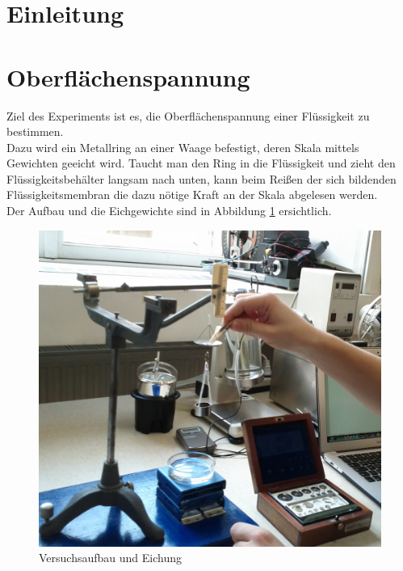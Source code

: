 \documentclass[12pt,a4paper]{article}
\begin{document}
\pagebreak
\setlength{\columnsep}{20pt}
\begin{multicols}{2}
\section{Einleitung}

\section{Oberflächenspannung}
Ziel des Experiments ist es, die Oberflächenspannung einer Flüssigkeit zu bestimmen. \\
Dazu wird ein Metallring an einer Waage befestigt, deren Skala mittels Gewichten geeicht wird. Taucht man den Ring in die Flüssigkeit und zieht den Flüssigkeitsbehälter langsam nach unten, kann beim Reißen der sich bildenden Flüssigkeitsmembran die dazu nötige Kraft an der Skala abgelesen werden.\\
Der Aufbau und die Eichgewichte sind in Abbildung \ref{fig:oberflaeche_eichung_aufbau} ersichtlich.\\


\begin{figure}[H]
	\centering
	\includegraphics[scale=0.2]{./figure/Waageneichung-Aufbau.png}
	\caption{Versuchsaufbau und Eichung}
	\label{fig:oberflaeche_eichung_aufbau}
\end{figure}



\end{multicols}
\end{document}
